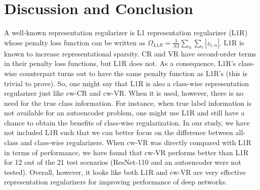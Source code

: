 \documentclass[letterpaper]{article} %
\begin{document}
\section{Discussion and Conclusion}
A well-known representation regularizer is L1 representation regularizer (L1R) whose penalty loss function can be written as ${\Omega}_{L1R}=\frac{1}{NI}\sum_n \sum_i |z_{i,n}|$. L1R is known to increase representational sparsity. CR and VR have second-order terms in their penalty loss functions, but L1R does not. As a consequence, L1R's class-wise counterpart turns out to have the same penalty function as L1R's (this is trivial to prove). So, one might say that L1R is also a class-wise representation regularizer just like cw-CR and cw-VR. When it is used, however, there is no need for the true class information. For instance, when true label information is not available for an autoencoder problem, one might use L1R and still have a chance to obtain the benefits of class-wise regularization. In our study, we have not included L1R such that we can better focus on the difference between all-class and class-wise regularizers. When cw-VR was directly compared with L1R in terms of performance, we have found that cw-VR performs better than L1R for 12 out of the 21 test scenarios (ResNet-110 and an autoencoder were not tested). Overall, however, it looks like both L1R and cw-VR are very effective representation regularizers for improving performance of deep networks. 
\end{document}
